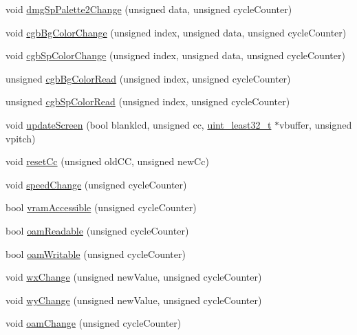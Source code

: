 \begin{DoxyCompactItemize}
\item 
void \hyperlink{classgambatte_1_1LCD_a2d6e69c85960561020bac66118bad859}{dmg\+Sp\+Palette2\+Change} (unsigned data, unsigned cycle\+Counter)
\item 
void \hyperlink{classgambatte_1_1LCD_a27150bfc8eab3ebf11dbba1282732517}{cgb\+Bg\+Color\+Change} (unsigned index, unsigned data, unsigned cycle\+Counter)
\item 
void \hyperlink{classgambatte_1_1LCD_ac8f3835b4821fbb87c35e2dd2d3b7498}{cgb\+Sp\+Color\+Change} (unsigned index, unsigned data, unsigned cycle\+Counter)
\item 
unsigned \hyperlink{classgambatte_1_1LCD_ae59d87cfa4dbe74cb59678fc2ebe2cc6}{cgb\+Bg\+Color\+Read} (unsigned index, unsigned cycle\+Counter)
\item 
unsigned \hyperlink{classgambatte_1_1LCD_a2fee3de77d90fa6d4316583385d4ee58}{cgb\+Sp\+Color\+Read} (unsigned index, unsigned cycle\+Counter)
\item 
void \hyperlink{classgambatte_1_1LCD_a6a057feecd6cf79fd09ce19ae91e11df}{update\+Screen} (bool blanklcd, unsigned cc, \hyperlink{namespacegambatte_a0639f09fccfbbd5a8e0796318768e370}{uint\+\_\+least32\+\_\+t} $\ast$vbuffer, unsigned vpitch)
\item 
void \hyperlink{classgambatte_1_1LCD_a94ef057d9f530884b5b66bab3a4a5500}{reset\+Cc} (unsigned old\+CC, unsigned new\+Cc)
\item 
void \hyperlink{classgambatte_1_1LCD_a0063fd56fea8f943c2033303e9cdc82b}{speed\+Change} (unsigned cycle\+Counter)
\item 
bool \hyperlink{classgambatte_1_1LCD_a3c94a2934259825fc8e54759aed4c7e5}{vram\+Accessible} (unsigned cycle\+Counter)
\item 
bool \hyperlink{classgambatte_1_1LCD_ac85da77238c2253e877f27ba3cc731c0}{oam\+Readable} (unsigned cycle\+Counter)
\item 
bool \hyperlink{classgambatte_1_1LCD_af0aafdd260473bbe749518838150240c}{oam\+Writable} (unsigned cycle\+Counter)
\item 
void \hyperlink{classgambatte_1_1LCD_ae935760f2500448e0178d99f24aa971a}{wx\+Change} (unsigned new\+Value, unsigned cycle\+Counter)
\item 
void \hyperlink{classgambatte_1_1LCD_a1e9b5824cab29aa84d2af1ff6431dd3e}{wy\+Change} (unsigned new\+Value, unsigned cycle\+Counter)
\item 
void \hyperlink{classgambatte_1_1LCD_a176a351682dbee928b2cbcd29236e2d2}{oam\+Change} (unsigned cycle\+Counter)
\item 

\end{DoxyCompactItemize}
